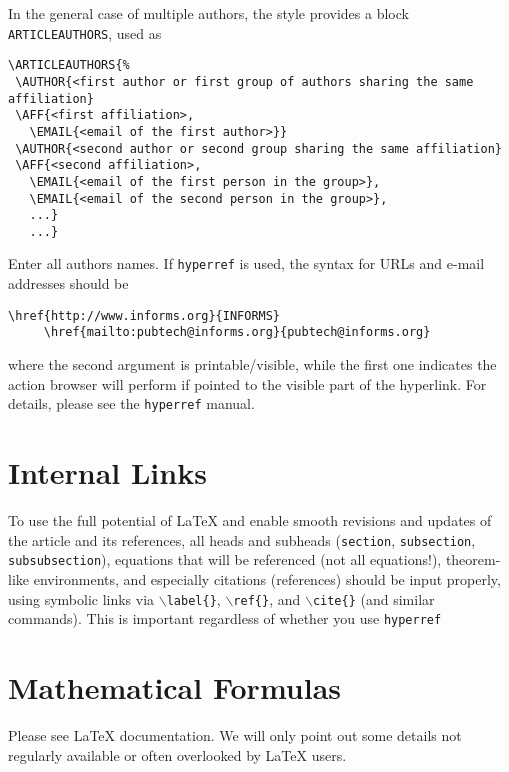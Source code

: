 \documentclass[ijds,nonblindrev]{informs4}
\begin{document}
In the general case of multiple authors, the style provides a block
\texttt{ARTICLEAUTHORS}, used as
\begin{Verbatim}[fontsize=\small]
 \ARTICLEAUTHORS{%
 \AUTHOR{<first author or first group of authors sharing the same affiliation} 
 \AFF{<first affiliation>,
   \EMAIL{<email of the first author>}}
 \AUTHOR{<second author or second group sharing the same affiliation} 
 \AFF{<second affiliation>,
   \EMAIL{<email of the first person in the group>},
   \EMAIL{<email of the second person in the group>},
   ...}
   ...}
\end{Verbatim}
     
\noindent 
Enter all authors names. If \texttt{hyperref} is used, the syntax for 
URLs and e-mail addresses should be

\begin{Verbatim}[fontsize=\small]
     \href{http://www.informs.org}{INFORMS}
     \href{mailto:pubtech@informs.org}{pubtech@informs.org}
\end{Verbatim}

\noindent
where the second argument is printable/visible, while the first one 
indicates the action browser will perform if pointed to the visible part of 
the hyperlink. For details, please see the \texttt{hyperref} manual.

\section{Internal Links}\label{sec4}

To use the full potential of LaTeX and enable smooth revisions and updates 
of the article and its references, all heads and subheads
(\texttt{section}, \texttt{subsection}, \texttt{subsubsection}), equations  
that will be referenced (not all equations!), theorem-like environments, and 
especially citations (references) should be input properly, using symbolic 
links via \texttt{$\backslash $label\{\}}, \texttt{$\backslash
$ref\{\}}, and \texttt{$\backslash $cite\{\}} (and similar  
commands). This is important regardless of whether you use \texttt{hyperref}

\section{Mathematical Formulas}\label{sec5}

Please see LaTeX documentation. We will only point out some details not 
regularly available or often overlooked by LaTeX users.
\end{document}
